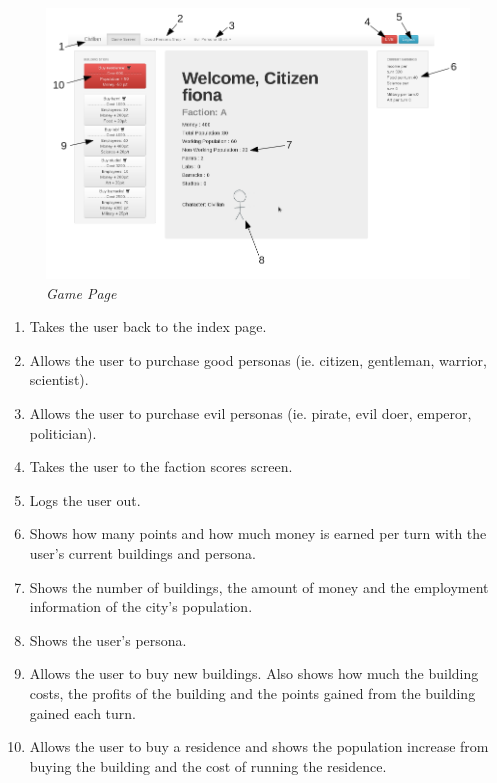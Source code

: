 \documentclass{sig-alt-release2}
\begin{document}
\begin{figure}[!htbp]
  \caption{\textit{Game Page}}
  \begin{center}
		\includegraphics[scale=0.30]{img/gamelabel.png}
  \end{center}
\end{figure}

\begin{enumerate}
\item Takes the user back to the index page.
\item Allows the user to purchase good personas (ie. citizen, gentleman, warrior, scientist).
\item Allows the user to purchase evil personas (ie. pirate, evil doer, emperor, politician).
\item Takes the user to the faction scores screen.
\item Logs the user out.
\item Shows how many points and how much money is earned per turn with the user's current buildings and persona.
\item Shows the number of buildings, the amount of money and the employment information of the city's population.
\item Shows the user's persona.
\item Allows the user to buy new buildings. Also shows how much the building costs, the profits of the building and the points gained from the building gained each turn.
\item Allows the user to buy a residence and shows the population increase from buying the building and the cost of running the residence.
\end{enumerate}
\end{document}
